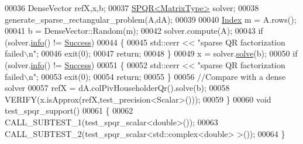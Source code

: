 \begin{DoxyCode}
00036   DenseVector refX,x,b; 
00037   \hyperlink{class_eigen_1_1_s_p_q_r}{SPQR<MatrixType>} solver; 
00038   generate\_sparse\_rectangular\_problem(A,dA);
00039   
00040   \hyperlink{namespace_eigen_a62e77e0933482dafde8fe197d9a2cfde}{Index} m = A.rows();
00041   b = DenseVector::Random(m);
00042   solver.compute(A);
00043   \textcolor{keywordflow}{if} (solver.\hyperlink{class_eigen_1_1_s_p_q_r_a3ab7bacba8d2be20adc10b4d5b6c071f}{info}() != \hyperlink{group__enums_gga85fad7b87587764e5cf6b513a9e0ee5ea52581b035f4b59c203b8ff999ef5fcea}{Success})
00044   \{
00045     std::cerr << \textcolor{stringliteral}{"sparse QR factorization failed\(\backslash\)n"};
00046     exit(0);
00047     \textcolor{keywordflow}{return};
00048   \}
00049   x = solver.\hyperlink{group___sparse_core___module_a4a66e9498b06e3ec4ec36f06b26d4e8f}{solve}(b);
00050   \textcolor{keywordflow}{if} (solver.\hyperlink{class_eigen_1_1_s_p_q_r_a3ab7bacba8d2be20adc10b4d5b6c071f}{info}() != \hyperlink{group__enums_gga85fad7b87587764e5cf6b513a9e0ee5ea52581b035f4b59c203b8ff999ef5fcea}{Success})
00051   \{
00052     std::cerr << \textcolor{stringliteral}{"sparse QR factorization failed\(\backslash\)n"};
00053     exit(0);
00054     \textcolor{keywordflow}{return};
00055   \}  
00056   \textcolor{comment}{//Compare with a dense solver}
00057   refX = dA.colPivHouseholderQr().solve(b);
00058   VERIFY(x.isApprox(refX,test\_precision<Scalar>()));
00059 \}
00060 \textcolor{keywordtype}{void} test\_spqr\_support()
00061 \{
00062   CALL\_SUBTEST\_1(test\_spqr\_scalar<double>());
00063   CALL\_SUBTEST\_2(test\_spqr\_scalar<std::complex<double> >());
00064 \}
\end{DoxyCode}

